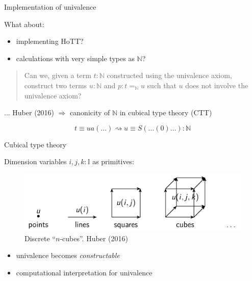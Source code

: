 \documentclass[english,draft]{beamer}
\begin{document}
\begin{frame}{Implementation of univalence}

What about:
\begin{itemize}
\item implementing HoTT?
\item calculations with very simple types as $\mathbb{N}$?
\end{itemize}

\begin{quotation}
Can we, given a term $t: \mathbb{N}$ constructed using the univalence axiom, construct two terms $u : \mathbb{N}$ and $p : t =_{\mathbb{N}} u$ such that $u$ does not involve the univalence axiom?
\end{quotation}

\pause

... Huber (2016) $\Rightarrow$ canonicity of $\mathbb{N}$ in cubical type theory (CTT)

$$ t \equiv ua ( ... )  \rightsquigarrow u \equiv S ( \dots ( 0 ) \ldots ) : \mathbb{N}  $$


\end{frame}


\begin{frame}{Cubical type theory}

Dimension variables $i,j,k : \mathbb{I}$ as primitives:

\begin{figure}[h!]
    \includegraphics[width=.7\textwidth]{figures/cubes.png}
    \caption{Discrete ``$n$-cubes''. Huber (2016)}
\end{figure}

\begin{itemize}
\item univalence becomes \emph{constructable}
\item computational interpretation for univalence 
\end{itemize}

\end{frame}
\end{document}

